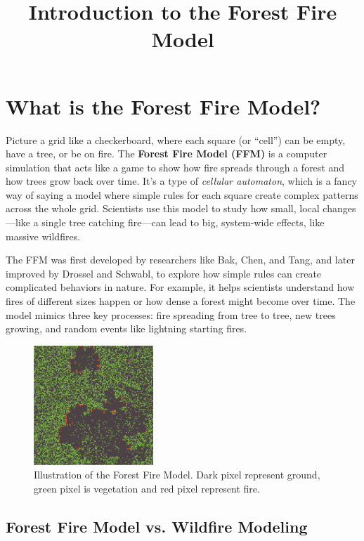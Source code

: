 \documentclass{article}
\title{Introduction to the Forest Fire Model}
\begin{document}
\maketitle

\section{What is the Forest Fire Model?}

Picture a grid like a checkerboard, where each square (or ``cell'') can be empty, have a tree, or be on fire. The \textbf{Forest Fire Model (FFM)} is a computer simulation that acts like a game to show how fire spreads through a forest and how trees grow back over time. It’s a type of \textit{cellular automaton}, which is a fancy way of saying a model where simple rules for each square create complex patterns across the whole grid. Scientists use this model to study how small, local changes---like a single tree catching fire---can lead to big, system-wide effects, like massive wildfires.

The FFM was first developed by researchers like Bak, Chen, and Tang, and later improved by Drossel and Schwabl, to explore how simple rules can create complicated behaviors in nature. For example, it helps scientists understand how fires of different sizes happen or how dense a forest might become over time. The model mimics three key processes: fire spreading from tree to tree, new trees growing, and random events like lightning starting fires.

\begin{figure}[htbp]
  \centering
  \includegraphics[width=0.4\textwidth]{projects/forest_fire/images/forest_fire.png}
  \caption{Illustration of the Forest Fire Model. Dark pixel represent ground, green pixel is vegetation and red pixel represent fire.}
  \label{fig:allee-effects}
\end{figure}


\subsection{Forest Fire Model vs. Wildfire Modeling}
\end{document}
